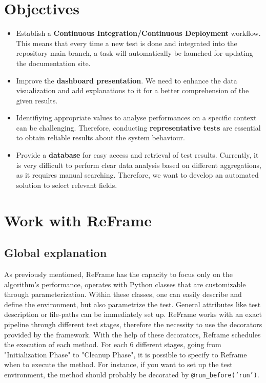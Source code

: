 \documentclass[12pt]{article}
\begin{document}
\section{Objectives}
\begin{itemize}
    \item Establish a \textbf{Continuous Integration/Continuous Deployment} workflow.
    This means that every time a new test is done and integrated into the repository main branch, a task will automatically be launched for updating the documentation site.
    \item Improve the \textbf{dashboard presentation}. We need to enhance the data visualization and add explanations to it for a better comprehension of the given results.
    \item Identifiying appropriate values to analyse performances on a specific context can be challenging. Therefore, conducting \textbf{representative tests} are essential to obtain reliable results about the system behaviour.
    \item Provide a \textbf{database} for easy access and retrieval of test results.
    Currently, it is very difficult to perform clear data analysis based on different aggregations, as it requires manual searching.
    Therefore, we want to develop an automated solution to select relevant fields.

\end{itemize}


\section{Work with ReFrame}

\subsection{Global explanation}
As previously mentioned, ReFrame has the capacity to focus only on the algorithm's performance, operates with Python classes that are customizable through parameterization.
Within these classes, one can easily describe and define the environment, but also parametrize the test.
General attributes like test description or file-paths can be immediately set up.
ReFrame works with an exact pipeline through different test stages, therefore the necessity to use the decorators provided by the framework.
With the help of these decorators, Reframe schedules the execution of each method.
For each 6 different stages, going from "Initialization Phase" to "Cleanup Phase", it is possible to specify to Reframe when to execute the method.
For instance, if you want to set up the test environment, the method should probably be decorated by \texttt{@run\_before('run')}.
\end{document}

